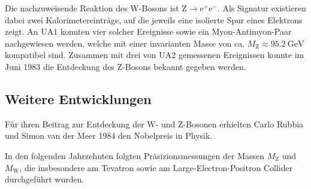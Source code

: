 Die nachzuweisende Reaktion des W-Bosons ist $\text{Z} \rightarrow \text{e}^+ \text{e}^-$.
Als Signatur existieren dabei zwei Kalorimetereinträge, auf die jeweils eine isolierte Spur eines Elektrons zeigt.
An UA1 konnten vier solcher Ereignisse sowie ein Myon-Antimyon-Paar nachgewiesen werden, welche mit einer invarianten Masse von ca. $M_\text{Z} \approx \SI{95.2}{\giga\electronvolt}$ kompatibel sind.
Zusammen mit drei von UA2 gemessenen Ereignissen konnte im Juni 1983 die Entdeckung des Z-Bosons bekannt gegeben werden.

\subsection{Weitere Entwicklungen}

Für ihren Beitrag zur Entdeckung der W- und Z-Bosonen erhielten Carlo Rubbia und Simon van der Meer 1984 den Nobelpreis in Physik.

In den folgenden Jahrzehnten folgten Präsizionsmessungen der Massen $M_\text{Z}$ und $M_\text{W}$, die insbesondere am Tevatron sowie am Large-Electron-Positron Collider durchgeführt wurden.